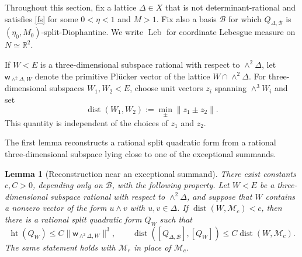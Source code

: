 \documentclass[reqno,11pt]{amsart}
\newtheorem{lem}[lem]{Lemma}
\theoremstyle{definition}
\theoremstyle{remark}
\numberwithin{equation}{section}
\newcommand{\Leb}{\operatorname{Leb}}
\begin{document}
Throughout this section, fix a lattice $\Delta\in X$ that is not
determinant-rational and satisfies \eqref{fs} for some $0<\eta<1$ and
$M>1$. Fix also a basis $\mathcal B$ for which
$Q_{\Delta,\mathcal B}$ is $(\eta_0,M_0)$-split-Diophantine. We write
$\Leb$ for coordinate Lebesgue measure on $N\simeq\mathbb R^2$.

If $W<E$ is a three-dimensional subspace rational with respect to
$\wedge^2\Delta$, let $\mathsf w_{\wedge^2\Delta,W}$ denote the primitive
Pl\"ucker vector of the lattice $W\cap\wedge^2\Delta$. For
three-dimensional subspaces $W_1,W_2<E$, choose unit vectors $z_i$
spanning $\wedge^3W_i$ and set
$$
\operatorname{dist}(W_1,W_2)
:=
\min_{\pm}\|z_1\pm z_2\|.
$$
This quantity is independent of the choices of $z_1$ and $z_2$.

The first lemma reconstructs a rational split quadratic form from a
rational three-dimensional subspace lying close to one of the exceptional
summands.

\begin{lem}[Reconstruction near an exceptional summand]
\label{lem:rational-ruling-reconstruction-d2}
There exist constants $c,C>0$, depending only on $\mathcal B$, with the
following property. Let $W<E$ be a three-dimensional subspace rational
with respect to $\wedge^2\Delta$, and suppose that $W$ contains a nonzero
vector of the form $u\wedge v$ with $u,v\in\Delta$. If
$\operatorname{dist}(W,\mathcal M_c)<c$, then there is a rational split
quadratic form $Q_W$ such that
$$
\operatorname{ht}(Q_W)
\le
C\|\mathsf w_{\wedge^2\Delta,W}\|^3,
\qquad
\operatorname{dist}([Q_{\Delta,\mathcal B}],[Q_W])
\le
C\operatorname{dist}(W,\mathcal M_c).
$$
The same statement holds with $\mathcal M_r$ in place of $\mathcal M_c$.
\end{lem}
\end{document}
